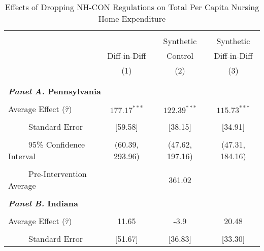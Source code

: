 \documentclass[../Main.tex]{subfiles}
\begin{document}
\newpage
\null
\vfill
\begin{table}[htbp]\centering \footnotesize
\def\sym#1{\ifmmode^{#1}\else\(^{#1}\)\fi}
\captionsetup{width=.78\textwidth}
\caption{\centering Effects of Dropping NH-CON Regulations on Total Per Capita Nursing Home Expenditure}
\label{tab:ave_results_tot_exp_nobord_nocov}
\setlength{\tabcolsep}{10pt}
\begin{tabular}{l*{3}{c}}
\hline\hline
\\[-2ex]
&\multicolumn{1}{c}{}&\multicolumn{1}{c}{Synthetic}&\multicolumn{1}{c}{Synthetic}\\
&\multicolumn{1}{c}{Diff-in-Diff}&\multicolumn{1}{c}{Control}&\multicolumn{1}{c}{Diff-in-Diff}\\
&\multicolumn{1}{c}{(1)}&\multicolumn{1}{c}{(2)}&\multicolumn{1}{c}{(3)}\\
\\[-2ex]
\hline
\\[-.1ex]
\multicolumn{4}{l}{\textbf{\textit{Panel A.} Pennsylvania}}\\
\\[-1.5ex]
\multicolumn{1}{l}{Average Effect ($\hat{\tau}$)}&   \multicolumn{1}{c}{$177.17^{***}$}&   \multicolumn{1}{c}{$122.39^{***}$}&  \multicolumn{1}{c}{$115.73^{***}$}\\
\\[-2ex]
\multicolumn{1}{l}{\ \ \ \ \ Standard Error}  &\multicolumn{1}{c}{[59.58]}&\multicolumn{1}{c}{[38.15]}&\multicolumn{1}{c}{[34.91]}\\
\\[-2ex]
\multicolumn{1}{l}{\ \ \ \ \ 95\% Confidence Interval}&   \multicolumn{1}{c}{(60.39, 293.96)}&   \multicolumn{1}{c}{(47.62, 197.16)}&   \multicolumn{1}{c}{(47.31, 184.16)}\\
\\[-2ex]
\multicolumn{1}{l}{\ \ \ \ \ Pre-Intervention Average}&   \multicolumn{3}{c}{361.02}\\
\\[-.1ex]
\multicolumn{4}{l}{\textbf{\textit{Panel B.} Indiana}}\\
\\[-1.5ex]
\multicolumn{1}{l}{Average Effect ($\hat{\tau}$)}&   \multicolumn{1}{c}{11.65}&   \multicolumn{1}{c}{-3.9}&  \multicolumn{1}{c}{20.48}\\
\\[-2ex]
\multicolumn{1}{l}{\ \ \ \ \ Standard Error}  &\multicolumn{1}{c}{[51.67]}&\multicolumn{1}{c}{[36.83]}&\multicolumn{1}{c}{[33.30]}\\

\end{tabular}
\end{table}
\end{document}
